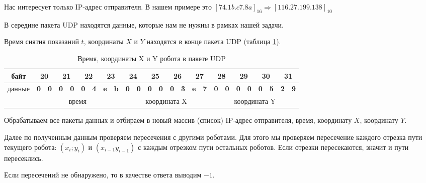 Нас интересует только IP-адрес отправителя. В нашем примере это $[74.1b.c7.8a]_{16} \Rightarrow [116.27.199.138]_{10}$ 

В середине пакета UDP находятся данные, которые нам не нужны в рамках нашей задачи.

Время снятия показаний $t$, координаты $X$ и $Y$ находятся в конце пакета UDP (таблица \ref{table:01_Found_intersects_02}).

\begin{table}[H]
	\begin{center}
		\begin{tabular}{|c|c|c|c|c|c|c|c|c|c|c|c|c|c|c|c|c|c|c|c|c|c|c|c|c|}
			\hline
			байт   & \multicolumn{2}{c|}{20} & \multicolumn{2}{c|}{21} & \multicolumn{2}{c|}{22} & \multicolumn{2}{c|}{23} & \multicolumn{2}{c|}{24} & \multicolumn{2}{c|}{25} & \multicolumn{2}{c|}{26} & \multicolumn{2}{c|}{27} & \multicolumn{2}{c|}{28} & \multicolumn{2}{c|}{29} & \multicolumn{2}{c|}{30} & \multicolumn{2}{c|}{31} \\ \hline
			данные & \textbf{0} & \textbf{0} & \textbf{0} & \textbf{0} & \textbf{0} & \textbf{4} & \textbf{e} & \textbf{b} & \textbf{0} & \textbf{0} & \textbf{0} & \textbf{0} & \textbf{0} & \textbf{3} & \textbf{e} & \textbf{7} & \textbf{0} & \textbf{0} & \textbf{0} & \textbf{0} & \textbf{0} & \textbf{5} & \textbf{2} & \textbf{9} \\ \hline
			& \multicolumn{8}{c|}{время}                                                                            & \multicolumn{8}{c|}{координата X}                                                                     & \multicolumn{8}{c|}{координата Y}                                                                     \\ \hline
		\end{tabular}
		\caption{Время, координаты X и Y робота в пакете UDP}
		\label{table:01_Found_intersects_02}
	\end{center}
\end{table}

Обрабатываем все пакеты данных и отбираем в новый массив (список) IP-адрес отправителя, время, координату $X$, координату $Y$.

Далее по полученным данным проверяем пересечения с другими роботами. Для этого мы проверяем пересечение каждого отрезка пути текущего робота: $(x_i;y_i)$ и $(x_{i-1} y_{i-1})$ с каждым отрезком пути остальных роботов. Если отрезки пересекаются, значит и пути пересеклись. 

Если пересечений не обнаружено, то в качестве ответа выводим $-1$.

